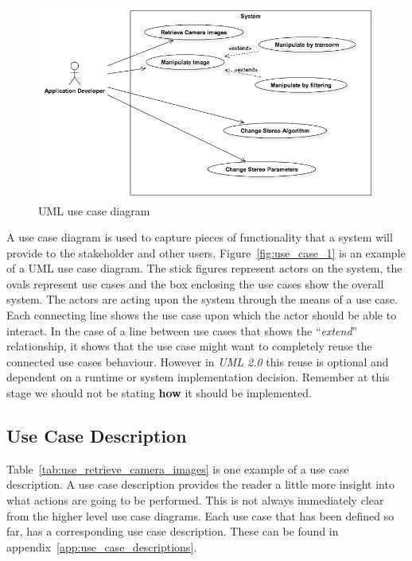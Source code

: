 \documentclass[11pt,oneside]{report}
\begin{document}
			\begin{figure}[ht]
			\begin{center}
    				\includegraphics[scale=0.45]{use_case_1}
    			\caption{UML use case diagram \protect {\label{fig:use_case_1}}}
    			\end{center}
			\end{figure}	
			A use case diagram is used to capture pieces of functionality that a system will provide to the stakeholder and other users.
			Figure~\ref{fig:use_case_1} is an example of a UML use case diagram.
			The stick figures represent actors on the system, the ovals represent use cases and the box enclosing the use cases show the overall system. 
			The actors are acting upon the system through the means of a use case.
			Each connecting line shows the use case upon which the actor should be able to interact.
			In the case of a line between use cases that shows the ``\textit{extend}'' relationship, it shows that the use case might want to completely reuse the connected use cases behaviour.
			However in \textit{UML 2.0} this reuse is optional and dependent on a runtime or system implementation decision.
			Remember at this stage we should not be stating \textbf{how} it should be implemented.
			\subsection{Use Case Description}
			Table~\ref{tab:use_retrieve_camera_images} is one example of a use case description.
			A use case description provides the reader a little more insight into what actions are going to be performed.
			This is not always immediately clear from the higher level use case diagrams.
			Each use case that has been defined so far, has a corresponding use case description.
			These can be found in appendix~\ref{app:use_case_descriptions}.
			
		\clearpage
\end{document}

